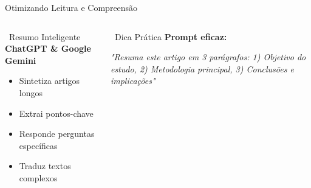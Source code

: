 \documentclass[aspectratio=169,12pt]{beamer}
\begin{document}
\begin{frame}{Otimizando Leitura e Compreensão}
    \begin{columns}
        \begin{column}{0.5\textwidth}
            \begin{block}{\faBookOpen\, Resumo Inteligente}
                \textbf{ChatGPT \& Google Gemini}
                \begin{itemize}
                    \item Sintetiza artigos longos
                    \item Extrai pontos-chave
                    \item Responde perguntas específicas
                    \item Traduz textos complexos
                \end{itemize}
            \end{block}
        \end{column}
        \begin{column}{0.5\textwidth}
            \begin{exampleblock}{\faLightbulb\, Dica Prática}
                \textcolor{warning}{\textbf{Prompt eficaz:}}
                
                \textit{"Resuma este artigo em 3 parágrafos: 1) Objetivo do estudo, 2) Metodologia principal, 3) Conclusões e implicações"}
            \end{exampleblock}
        \end{column}
    \end{columns}
\end{frame}
\end{document}
